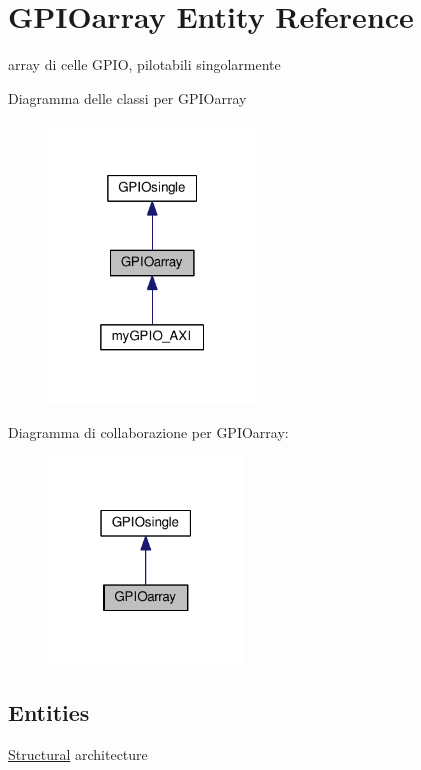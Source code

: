 \hypertarget{class_g_p_i_oarray}{\section{G\+P\+I\+Oarray Entity Reference}
\label{class_g_p_i_oarray}
}


array di celle G\+P\+I\+O, pilotabili singolarmente  




Diagramma delle classi per G\+P\+I\+Oarray\nopagebreak
\begin{figure}[H]
\begin{center}
\leavevmode
\includegraphics[width=157pt]{class_g_p_i_oarray__inherit__graph}
\end{center}
\end{figure}


Diagramma di collaborazione per G\+P\+I\+Oarray\+:\nopagebreak
\begin{figure}[H]
\begin{center}
\leavevmode
\includegraphics[width=147pt]{class_g_p_i_oarray__coll__graph}
\end{center}
\end{figure}
\subsection*{Entities}
\begin{DoxyCompactItemize}
\item 
\hyperlink{class_g_p_i_oarray_1_1_structural}{Structural} architecture
\end{DoxyCompactItemize}
